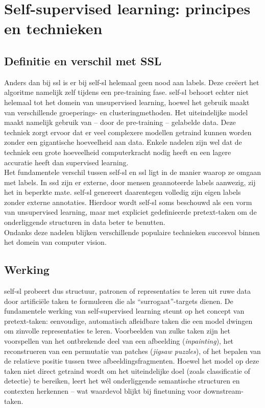 \section{Self-supervised learning: principes en technieken}

\subsection{Definitie en verschil met SSL}

Anders dan bij \gls{ssl} is er bij \gls{self-sl} helemaal geen nood aan labels. Deze creëert het algoritme namelijk zelf tijdens een pre-training fase. \Gls{self-sl} behoort echter niet helemaal tot het domein van unsupervised learning, hoewel het gebruik maakt van verschillende groeperings- en clusteringmethoden. Het uiteindelijke model maakt namelijk gebruik van -- door de pre-training -- gelabelde data. Deze techniek zorgt ervoor dat er veel complexere modellen getraind kunnen worden zonder een gigantische hoeveelheid aan data. Enkele nadelen zijn wel dat de techniek een grote hoeveelheid computerkracht nodig heeft en een lagere accuratie heeft dan supervised learning. \autocite{Gui_2024} \\

Het fundamentele verschil tussen \gls{self-sl} en \gls{ssl} ligt in de manier waarop ze omgaan met labels. In \gls{ssd} zijn er externe, door mensen geannoteerde labels aanwezig, zij het in beperkte mate. \Gls{self-sl} genereert daarentegen volledig zijn eigen labels zonder externe annotaties. Hierdoor wordt \gls{self-sl} soms beschouwd als een vorm van unsupervised learning, maar met expliciet gedefinieerde pretext-taken om de onderliggende structuren in data beter te benutten. \\

Ondanks deze nadelen blijken verschillende populaire technieken succesvol binnen het domein van computer vision.

\subsection{Werking}

\Gls{self-sl} probeert dus structuur, patronen of representaties te leren uit ruwe data door artificiële taken te formuleren die als ``surrogaat''-targets dienen. De fundamentele werking van self-supervised learning steunt op het concept van pretext-taken: eenvoudige, automatisch afleidbare taken die een model dwingen om zinvolle representaties te leren. Voorbeelden van zulke taken zijn het voorspellen van het ontbrekende deel van een afbeelding (\emph{inpainting}), het reconstrueren van een permutatie van patches (\emph{jigsaw puzzles}), of het bepalen van de relatieve positie tussen twee afbeeldingsfragmenten. Hoewel het model op deze taken niet direct getraind wordt om het uiteindelijke doel (zoals classificatie of detectie) te bereiken, leert het wél onderliggende semantische structuren en contexten herkennen -- wat waardevol blijkt bij finetuning voor downstream-taken. \\

